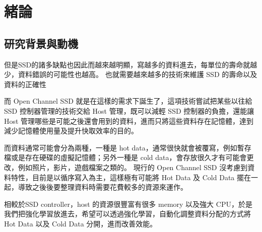 \chapter{緒論}
\section{研究背景與動機}
\indent
但是SSD的諸多缺點也因此而越來越明顯，寫越多的資料進去，每單位的壽命就越少，資料錯誤的可能性也越高。
也就需要越來越多的技術來維護 SSD 的壽命以及資料的正確性

而 Open Channel SSD 就是在這樣的需求下誕生了，這項技術嘗試把某些以往給 SSD 控制器管理的技術交給 Host 管理，既可以減輕 SSD 控制器的負擔，還能讓 Host 管理哪些是可能之後還會用到的資料，進而只將這些資料存在記憶體，達到減少記憶體使用量及提升快取效率的目的。

而資料通常可能會分為兩種，一種是 hot data，通常很快就會被覆寫，例如暫存檔或是存在硬碟的虛擬記憶體；另外一種是 cold data，會存放很久才有可能會更改，例如照片，影片，遊戲檔案之類的。
現行的 Open Channel SSD 沒考慮到資料特性，目前是以循序寫入為主，這樣極有可能將 Hot Data 及 Cold Data 擺在一起，導致之後後要整理資料時需要花費較多的資源來運作。

相較於SSD controller，host 的資源很豐富有很多 memory 以及強大 CPU，於是我們把強化學習放進去，希望可以透過強化學習，自動化調整資料分配的方式將 Hot Data 以及 Cold Data 分開，進而改善效能。



